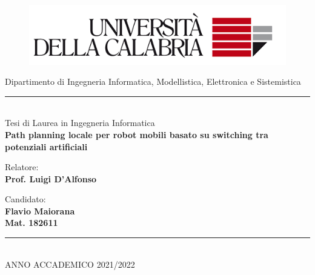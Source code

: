 \documentclass[14pt,a4paper]{extarticle}
\begin{document}

\begin{titlepage}

\begin{center}
\begin{figure}[H]
\centering
\includegraphics{unical2.png}
\end{figure}
{\Large Dipartimento di Ingegneria Informatica, Modellistica, Elettronica e Sistemistica}
\vspace{10mm}
\rule{\textwidth}{1pt}\\
\vspace*{5cm}
{\Large Tesi di Laurea in Ingegneria Informatica}\\
\vspace*{0.5cm}
{\huge \textbf{Path planning locale per robot mobili basato su switching tra potenziali artificiali}}
\vspace{5cm}
\end{center}

\begin{minipage}[t]{0.5\textwidth}
{\large{Relatore: \\ \bf Prof. Luigi D'Alfonso}}
\end{minipage}
\hfill
\begin{minipage}[t]{0.4\textwidth}\raggedleft
{\large{Candidato: \\ \bf Flavio Maiorana\\ Mat. 182611}}
\end{minipage}

\begin{center}
\rule{\textwidth}{1pt}\\
ANNO ACCADEMICO 2021/2022
\end{center}

\end{titlepage}

\newpage \tableofcontents \newpage %
\end{document}
